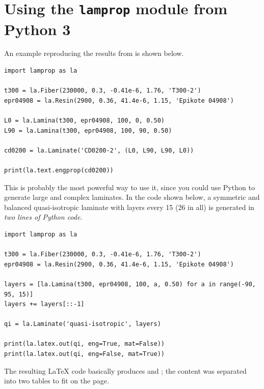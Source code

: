 \documentclass[a4paper,landscape,oneside,11pt,twocolumn]{memoir}
\begin{document}
\section{Using the \texttt{lamprop} module from Python 3} %

An example reproducing the results from  is shown
below.

\begin{lstlisting}
import lamprop as la

t300 = la.Fiber(230000, 0.3, -0.41e-6, 1.76, 'T300-2')
epr04908 = la.Resin(2900, 0.36, 41.4e-6, 1.15, 'Epikote 04908')

L0 = la.Lamina(t300, epr04908, 100, 0, 0.50)
L90 = la.Lamina(t300, epr04908, 100, 90, 0.50)

cd0200 = la.Laminate('CD0200-2', (L0, L90, L90, L0))

print(la.text.engprop(cd0200))
\end{lstlisting}

This is probably the most powerful way to use it, since you could use Python
to generate large and complex laminates. In the code shown below, a symmetric
and balanced quasi-isotropic laminate with layers every 15\textdegree{} (26 in
all) is generated in \emph{two lines of Python code}.

\begin{lstlisting}
import lamprop as la

t300 = la.Fiber(230000, 0.3, -0.41e-6, 1.76, 'T300-2')
epr04908 = la.Resin(2900, 0.36, 41.4e-6, 1.15, 'Epikote 04908')

layers = [la.Lamina(t300, epr04908, 100, a, 0.50) for a in range(-90, 95, 15)]
layers += layers[::-1]

qi = la.Laminate('quasi-isotropic', layers)

print(la.latex.out(qi, eng=True, mat=False))
print(la.latex.out(qi, eng=False, mat=True))
\end{lstlisting}

The resulting \LaTeX{} code basically produces  and
; the content was separated into two tables to
fit on the page.
\end{document}
